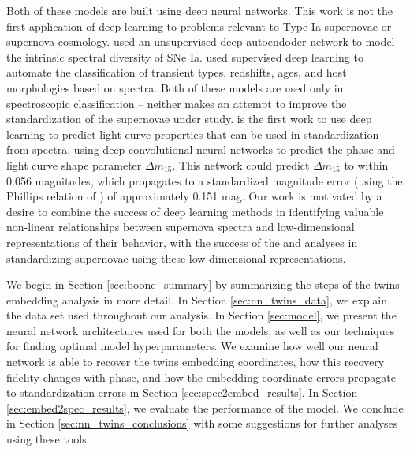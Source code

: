 Both of these models are built using deep neural networks. This work is not the first application of deep learning to problems relevant to Type Ia supernovae or supernova cosmology. \citet{sasdelli_exploring_2016} used an unsupervised deep autoendoder network to model the intrinsic spectral diversity of SNe Ia. \citet{muthukrishna_dash_2019} used supervised deep learning to automate the classification of transient types, redshifts, ages, and host morphologies based on spectra. Both of these models are used only in spectroscopic classification -- neither makes an attempt to improve the standardization of the supernovae under study. \citet{stahl_deepsip_2020} is the first work to use deep learning to predict light curve properties that can be used in standardization from spectra, using deep convolutional neural networks to predict the phase and light curve shape parameter $\Delta m_{15}$. This network could predict $\Delta m_{15}$ to within 0.056 magnitudes, which propagates to a standardized magnitude error (using the Phillips relation of \citet{phillips_absolute_1993}) of approximately 0.151 mag. Our work is motivated by a desire to combine the success of deep learning methods in identifying valuable non-linear relationships between supernova spectra and low-dimensional representations of their behavior, with the success of the  and  analyses in standardizing supernovae using these low-dimensional representations. 

We begin in Section \ref{sec:boone_summary} by summarizing the steps of the twins embedding analysis in more detail. In Section \ref{sec:nn_twins_data}, we explain the data set used throughout our analysis. In Section \ref{sec:model}, we present the neural network architectures used for both the models, as well as our techniques for finding optimal model hyperparameters. We examine how well our neural network is able to recover the twins embedding coordinates, how this recovery fidelity changes with phase, and how the embedding coordinate errors propagate to standardization errors in Section \ref{sec:spec2embed_results}. In Section \ref{sec:embed2spec_results}, we evaluate the performance of the \etos{} model. We conclude in Section \ref{sec:nn_twins_conclusions} with some suggestions for further analyses using these tools.

